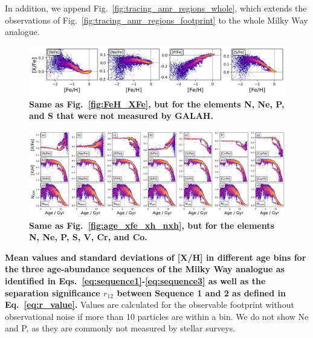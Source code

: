 \documentclass[fleqn,usenatbib]{mnras}
\begin{document}
In addition, we append Fig.~\ref{fig:tracing_amr_regions_whole}, which extends the observations of Fig.~\ref{fig:tracing_amr_regions_footprint} to the whole Milky Way analogue.

\begin{figure}
	\includegraphics[width=\textwidth]{figures/Overview_FeH_XFe_Sim_only.png}
    \caption{
    \textbf{Same as Fig.~\ref{fig:FeH_XFe}, but for the elements N, Ne, P, and S that were not measured by GALAH.}
    }
    \label{fig:appendix_feh_xfe_nneps}
\end{figure}

\begin{figure}
	\includegraphics[width=\textwidth]{figures/age_xfe_xh_nxh_others.png}
    \caption{
    \textbf{Same as Fig.~\ref{fig:age_xfe_xh_nxh}, but for the elements N, Ne, P, S, V, Cr, and Co.}
    }
    \label{fig:appendix_xfe_xh_nx}
\end{figure}

\begin{table}
    \centering
    \caption{\textbf{Mean values and standard deviations of {[X/H]} in different age bins for the three age-abundance sequences of the Milky Way analogue as identified in Eqs.~\ref{eq:sequence1}-\ref{eq:sequence3} as well as the separation significance $r_{12}$ between Sequence 1 and 2 as defined in Eq.~\ref{eq:r_value}.} Values are calculated for the observable footprint without observational noise if more than 10 particles are within a bin. We do not show Ne and P, as they are commonly not measured by stellar surveys.}
    \tiny
    
    \label{tab:tabular_separation_r12}
\end{table}
\end{document}
